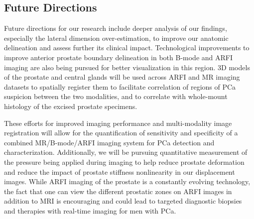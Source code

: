 \subsection{Future Directions}
Future directions for our research include deeper analysis of our findings,
especially the lateral dimension over-estimation, to improve our anatomic
delineation and assess further its clinical impact.  Technological improvements
to improve anterior prostate boundary delineation in both B-mode and ARFI
imaging are also being pursued for better visualization in this region.  3D
models of the prostate and central glands will be used across ARFI and MR
imaging datasets to spatially register them to facilitate correlation of
regions of PCa suspicion between the two modalities, and to correlate with
whole-mount histology of the excised prostate specimens.  

These
efforts for improved imaging performance and multi-modality image registration
will allow for the quantification of sensitivity and specificity of a combined
MR/B-mode/ARFI imaging system for PCa detection and characterization.
Additionally, we will be pursuing quantitative measurement of the pressure
being applied during imaging to help reduce prostate deformation and reduce the
impact of prostate stiffness nonlinearity in our displacement images.  While
ARFI imaging of the prostate is a constantly evolving technology, the fact that
one can view the different prostatic zones on ARFI images in addition to MRI is
encouraging and could lead to targeted diagnostic biopsies and therapies with
real-time imaging for men with PCa. 

